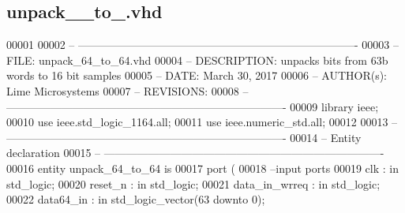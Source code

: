 \subsection{unpack\+\_\+\_\+to\+\_.\+vhd}
\label{unpack__64__to__64_8vhd_source}

\begin{DoxyCode}
00001 
00002 \textcolor{keyword}{-- ---------------------------------------------------------------------------- }
00003 \textcolor{keyword}{-- FILE:    unpack\_64\_to\_64.vhd}
00004 \textcolor{keyword}{-- DESCRIPTION: unpacks bits from 63b words to 16 bit samples}
00005 \textcolor{keyword}{-- DATE:    March 30, 2017}
00006 \textcolor{keyword}{-- AUTHOR(s):   Lime Microsystems}
00007 \textcolor{keyword}{-- REVISIONS:}
00008 \textcolor{keyword}{-- ---------------------------------------------------------------------------- }
00009 \textcolor{vhdlkeyword}{library }\textcolor{keywordflow}{ieee};
00010 \textcolor{vhdlkeyword}{use }ieee.std\_logic\_1164.\textcolor{keywordflow}{all};
00011 \textcolor{vhdlkeyword}{use }ieee.numeric\_std.\textcolor{keywordflow}{all};
00012 
00013 \textcolor{keyword}{-- ----------------------------------------------------------------------------}
00014 \textcolor{keyword}{-- Entity declaration}
00015 \textcolor{keyword}{-- ----------------------------------------------------------------------------}
00016 \textcolor{keywordflow}{entity }unpack_64_to_64 \textcolor{keywordflow}{is}
00017   \textcolor{keywordflow}{port} \textcolor{vhdlchar}{(}
00018 \textcolor{keyword}{      --input ports }
00019       \textcolor{vhdlchar}{clk}               \textcolor{vhdlchar}{:} \textcolor{keywordflow}{in} \textcolor{comment}{std\_logic};
00020       \textcolor{vhdlchar}{reset_n}           \textcolor{vhdlchar}{:} \textcolor{keywordflow}{in} \textcolor{comment}{std\_logic};
00021         \textcolor{vhdlchar}{data_in_wrreq}   \textcolor{vhdlchar}{:} \textcolor{keywordflow}{in} \textcolor{comment}{std\_logic};
00022         \textcolor{vhdlchar}{data64_in}       \textcolor{vhdlchar}{:} \textcolor{keywordflow}{in} \textcolor{comment}{std\_logic\_vector}\textcolor{vhdlchar}{(}\textcolor{vhdllogic}{}\textcolor{vhdllogic}{63} \textcolor{keywordflow}{downto} \textcolor{vhdllogic}{}\textcolor{vhdllogic}{0}\textcolor{vhdlchar}{)};

\end{DoxyCode}
